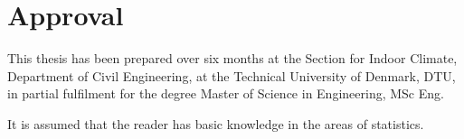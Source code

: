 \section*{Approval}
This thesis has been prepared over six months at the Section for Indoor Climate, Department of Civil Engineering, at the Technical University of Denmark, DTU, in partial fulfilment for the degree Master of Science in Engineering, MSc Eng. 

It is assumed that the reader has basic knowledge in the areas of statistics. 

\vfill

\begin{center}
\namesigdate{\thesisauthor~-~\studentnumber}
\end{center}

\vfill

